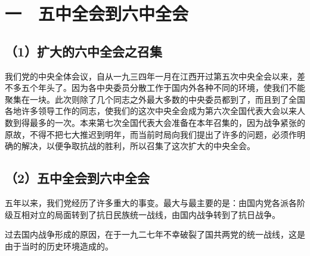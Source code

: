 \section{一　五中全会到六中全会}

\subsection{（1）扩大的六中全会之召集}

我们党的中央全体会议，自从一九三四年一月在江西开过第五次中央全会以来，差不多五个年头了。因为各中央委员分散工作于国内外各种不同的环境，使我们不能聚集在一块。此次则除了几个同志之外最大多数的中央委员都到了，而且到了全国各地许多领导工作的同志，使我们的这次中央全会成为第六次全国代表大会以来人数到得最多的一次。本来第七次全国代表大会准备在本年召集的，因为战争紧张的原故，不得不把七大推迟到明年，而当前时局向我们提出了许多的问题，必须作明确的解决，以便争取抗战的胜利，所以召集了这次扩大的中央全会。

\subsection{（2）五中全会到六中全会}

五年以来，我们党经历了许多重大的事变。最大与最主要的是：由国内党各派各阶级互相对立的局面转到了抗日民族统一战线，由国内战争转到了抗日战争。

过去国内战争形成的原因，在于一九二七年不幸破裂了国共两党的统一战线，这是由于当时的历史环境造成的。

